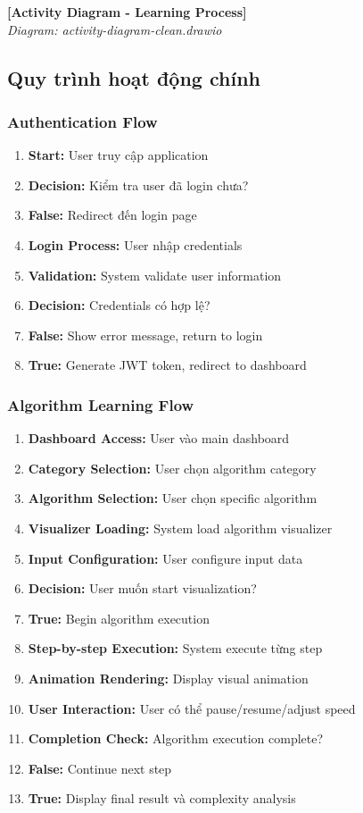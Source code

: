 \begin{center}
\textbf{[Activity Diagram - Learning Process]}\\
\textit{Diagram: activity-diagram-clean.drawio}
\end{center}

\subsection{Quy trình hoạt động chính}

\subsubsection{Authentication Flow}
\begin{enumerate}
    \item \textbf{Start:} User truy cập application
    \item \textbf{Decision:} Kiểm tra user đã login chưa?
    \item \textbf{False:} Redirect đến login page
    \item \textbf{Login Process:} User nhập credentials
    \item \textbf{Validation:} System validate user information
    \item \textbf{Decision:} Credentials có hợp lệ?
    \item \textbf{False:} Show error message, return to login
    \item \textbf{True:} Generate JWT token, redirect to dashboard
\end{enumerate}

\subsubsection{Algorithm Learning Flow}
\begin{enumerate}
    \item \textbf{Dashboard Access:} User vào main dashboard
    \item \textbf{Category Selection:} User chọn algorithm category
    \item \textbf{Algorithm Selection:} User chọn specific algorithm
    \item \textbf{Visualizer Loading:} System load algorithm visualizer
    \item \textbf{Input Configuration:} User configure input data
    \item \textbf{Decision:} User muốn start visualization?
    \item \textbf{True:} Begin algorithm execution
    \item \textbf{Step-by-step Execution:} System execute từng step
    \item \textbf{Animation Rendering:} Display visual animation
    \item \textbf{User Interaction:} User có thể pause/resume/adjust speed
    \item \textbf{Completion Check:} Algorithm execution complete?
    \item \textbf{False:} Continue next step
    \item \textbf{True:} Display final result và complexity analysis
\end{enumerate}

